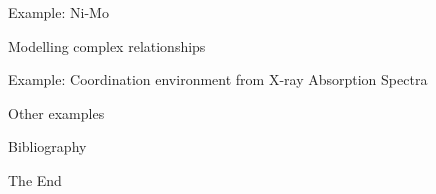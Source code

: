 \documentclass[aspectratio=169]{beamer}
\begin{document}
\begin{frame}{Example: Ni-Mo}
    
\end{frame}


\begin{frame}{Modelling complex relationships}
    
\end{frame}


\begin{frame}{Example: Coordination environment from X-ray Absorption Spectra}
    
\end{frame}


\begin{frame}{Other examples}
    
\end{frame}

\begin{frame}[allowframebreaks]{Bibliography}
    
    
\end{frame}


\begin{frame}
    \Huge{\centerline{The End}}
\end{frame}
\end{document}
